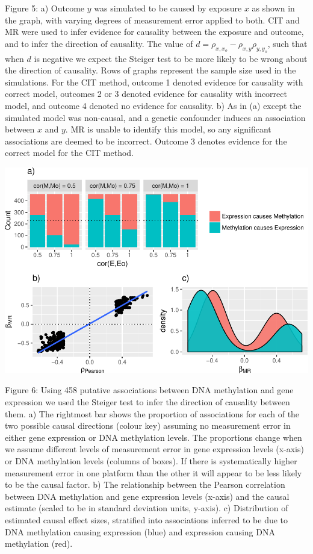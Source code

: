 \documentclass[]{article}
\begin{document}
Figure 5: a) Outcome \(y\) was simulated to be caused by exposure \(x\)
as shown in the graph, with varying degrees of measurement error applied
to both. CIT and MR were used to infer evidence for causality between
the exposure and outcome, and to infer the direction of causality. The
value of \(d = \rho_{x, x_o} - \rho_{x,y}\rho_{y,y_o}\), such that when
\(d\) is negative we expect the Steiger test to be more likely to be
wrong about the direction of causality. Rows of graphs represent the
sample size used in the simulations. For the CIT method, outcome 1
denoted evidence for causality with correct model, outcomes 2 or 3
denoted evidence for causality with incorrect model, and outcome 4
denoted no evidence for causality. b) As in (a) except the simulated
model was non-causal, and a genetic confounder induces an association
between \(x\) and \(y\). MR is unable to identify this model, so any
significant associations are deemed to be incorrect. Outcome 3 denotes
evidence for the correct model for the CIT method.

\newpage

\includegraphics{manuscript_files/figure-latex/shakhplot-1.pdf}

Figure 6: Using 458 putative associations between DNA methylation and
gene expression we used the Steiger test to infer the direction of
causality between them. a) The rightmost bar shows the proportion of
associations for each of the two possible causal directions (colour key)
assuming no measurement error in either gene expression or DNA
methylation levels. The proportions change when we assume different
levels of measurement error in gene expression levels (x-axis) or DNA
methylation levels (columns of boxes). If there is systematically higher
measurement error in one platform than the other it will appear to be
less likely to be the causal factor. b) The relationship between the
Pearson correlation between DNA methylation and gene expression levels
(x-axis) and the causal estimate (scaled to be in standard deviation
units, y-axis). c) Distribution of estimated causal effect sizes,
stratified into associations inferred to be due to DNA methylation
causing expression (blue) and expression causing DNA methylation (red).
\end{document}
